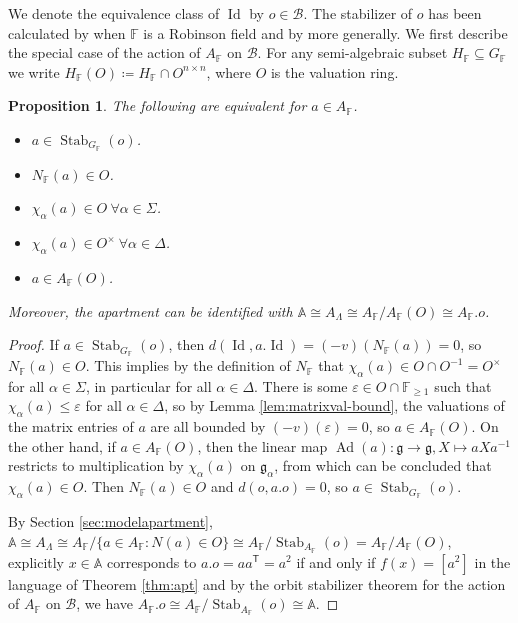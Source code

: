 \documentclass[12pt]{amsart}
\newcommand{\F}{\mathbb{F} }
\newcommand{\frakg}{\mathfrak{g}}
\newcommand{\A}{\mathbb{A}}
\newcommand{\B}{\mathcal{B}}
\newcommand{\tran}{{^{\mathsf{T}}\!}}
\numberwithin{equation}{section}
\newtheorem{proposition}[theorem]{Proposition}
\theoremstyle{remark} %
\begin{document}
We denote the equivalence class of $\operatorname{Id}$ by $o\in \B$. The stabilizer of $o$ has been calculated by \cite{Tho} when $\F$ is a Robinson field and by \cite{KrTe} more generally. We first describe the special case of the action of $A_\F$ on $\B$. For any semi-algebraic subset $H_\F\subseteq G_\F$ we write $H_\F(O) \coloneqq H_\F \cap O^{n\times n}$, where $O$ is the valuation ring.

\begin{proposition}\label{prop:stab_A}
	The following are equivalent for $a\in A_\F$.
	\begin{itemize}
		\item [(i)] $a \in \operatorname{Stab}_{G_\F}(o)$.
		\item [(ii)]  $N_\F(a) \in O$.
		\item [(iii)] $\chi_\alpha(a) \in O \ \forall \alpha \in \Sigma $.
		\item [(iv)]  $\chi_\alpha(a) \in O^\times \ \forall \alpha \in \Delta $.
		\item [(v)] $a \in A_\F(O)$.
	\end{itemize}
Moreover, the apartment can be identified with $\A \cong A_\Lambda \cong A_\F/A_\F(O) \cong A_\F. o $.
\end{proposition}
\begin{proof}
	If $a\in \operatorname{Stab}_{G_\F}(o)$, then $d(\operatorname{Id},a.\operatorname{Id}) = (-v)(N_\F(a)) = 0$, so $N_\F(a) \in O$. This implies by the definition of $N_\F$ that $\chi_\alpha(a) \in O \cap O^{-1} = O^\times$ for all $\alpha \in \Sigma$, in particular for all $\alpha \in \Delta$. There is some $\varepsilon \in O \cap \F_{\geq 1}$ such that $\chi_\alpha(a) \leq \varepsilon$ for all $\alpha \in \Delta$, so by Lemma \ref{lem:matrixval-bound}, the valuations of the matrix entries of $a$ are all bounded by $(-v)(\varepsilon) = 0$, so $a \in A_\F(O)$.
On the other hand, if $a\in A_\F(O)$, then the linear map $\operatorname{Ad}(a) \colon \frakg \to \frakg, X \mapsto aXa^{-1}$ restricts to multiplication by $\chi_\alpha(a)$ on $\frakg_\alpha$, from which can be concluded that $\chi_\alpha(a) \in O$.	Then $N_\F(a) \in O$ and $d(o,a.o) =0$, so $a \in \operatorname{Stab}_{G_\F}(o)$.

By Section \ref{sec:modelapartment}, $\A \cong A_\Lambda \cong A_\F/\{a \in A_\F \colon N(a) \in O \} \cong A_\F / \operatorname{Stab}_{A_\F}(o) = A_\F / A_\F(O)$, explicitly $x\in\A$ corresponds to $a.o=aa\tran = a^2$ if and only if $f(x)=[a^2]$ in the language of Theorem \ref{thm:apt} and by the orbit stabilizer theorem for the action of $A_\F$ on $\B$, we have $A_\F.o \cong A_\F/\operatorname{Stab}_{A_\F}(o) \cong \A$.
\end{proof}
\end{document}
